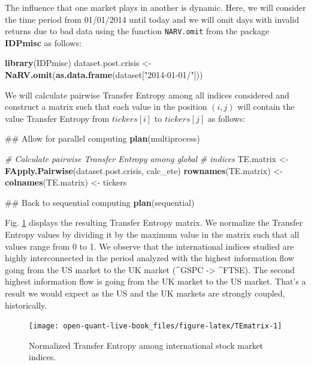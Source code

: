 \documentclass[]{book}
\newenvironment{Shaded}{\begin{snugshade}}{\end{snugshade}}
\newcommand{\KeywordTok}[1]{\textcolor[rgb]{0.13,0.29,0.53}{\textbf{#1}}}
\newcommand{\StringTok}[1]{\textcolor[rgb]{0.31,0.60,0.02}{#1}}
\newcommand{\CommentTok}[1]{\textcolor[rgb]{0.56,0.35,0.01}{\textit{#1}}}
\newcommand{\NormalTok}[1]{#1}
\theoremstyle{definition}
\theoremstyle{definition}
\theoremstyle{definition}
\theoremstyle{remark}
\begin{document}
The influence that one market plays in another is dynamic. Here, we will
consider the time period from 01/01/2014 until today and we will omit
days with invalid returns due to bad data using the function
\texttt{NARV.omit} from the package \textbf{IDPmisc} as follows:

\begin{Shaded}
\begin{Highlighting}[]
\KeywordTok{library}\NormalTok{(IDPmisc)}
\NormalTok{dataset.post.crisis <-}\StringTok{ }\KeywordTok{NaRV.omit}\NormalTok{(}\KeywordTok{as.data.frame}\NormalTok{(dataset[}\StringTok{"2014-01-01/"}\NormalTok{]))}
\end{Highlighting}
\end{Shaded}

We will calculate pairwise Transfer Entropy among all indices considered
and construct a matrix such that each value in the position \((i,j)\)
will contain the value Transfer Entropy from \(tickers[i]\) to
\(tickers[j]\) as follows:

\begin{Shaded}
\begin{Highlighting}[]
\NormalTok{## Allow for parallel computing}
\KeywordTok{plan}\NormalTok{(multiprocess)}

\CommentTok{# Calculate pairwise Transfer Entropy among global}
\CommentTok{# indices}
\NormalTok{TE.matrix <-}\StringTok{ }\KeywordTok{FApply.Pairwise}\NormalTok{(dataset.post.crisis, calc_ete)}
\KeywordTok{rownames}\NormalTok{(TE.matrix) <-}\StringTok{ }\KeywordTok{colnames}\NormalTok{(TE.matrix) <-}\StringTok{ }\NormalTok{tickers}

\NormalTok{## Back to sequential computing}
\KeywordTok{plan}\NormalTok{(sequential)}
\end{Highlighting}
\end{Shaded}

Fig. \ref{fig:TEmatrix} displays the resulting Transfer Entropy matrix.
We normalize the Transfer Entropy values by dividing it by the maximum
value in the matrix such that all values range from 0 to 1. We observe
that the international indices studied are highly interconnected in the
period analyzed with the highest information flow going from the US
market to the UK market (\^{}GSPC -\textgreater{} \^{}FTSE). The second
highest information flow is going from the UK market to the US market.
That's a result we would expect as the US and the UK markets are
strongly coupled, historically.

\begin{figure}[H]

{\centering \texttt{[image: open-quant-live-book\_files/figure-latex/TEmatrix-1]} 

}

\caption{Normalized Transfer Entropy among international stock market indices.}\label{fig:TEmatrix}
\end{figure}
\end{document}

